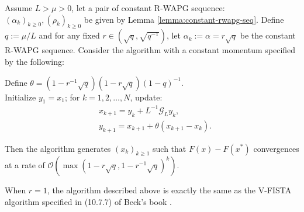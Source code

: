 \documentclass[12pt]{article}
\begin{document}
        \begin{theorem}\label{thm:fixed-momentum-fista}
            Assume $L > \mu > 0$, let a pair of constant R-WAPG sequence: $(\alpha_k)_{k \ge0}, (\rho_k)_{k \ge 0}$ be given by Lemma \ref{lemma:constant-rwapg-seq}.
            Define $q := \mu/L$ and for any fixed $r \in \left(\sqrt{q}, \sqrt{q^{-1}}\right)$, let $\alpha_k := \alpha = r \sqrt{q}$ be the constant R-WAPG sequence. 
            Consider the algorithm with a constant momentum specified by the following: 
            \begin{tcolorbox}
                Define $\theta = \left(1 - r^{-1}\sqrt{q}\right)(1 - r\sqrt{q})(1 - q)^{-1}$. 
                \\
                Initialize $y_1 = x_1$; for $k = 1, 2, \ldots, N$, update: 
                \begin{align*}
                    &x_{k + 1} = y_k + L^{-1}\mathcal G_L y_k, 
                    \\
                    & y_{k + 1} = x_{k + 1} + \theta(x_{k + 1} - x_k). 
                \end{align*}
            \end{tcolorbox}
            Then the algorithm generates $(x_k)_{k \ge 1}$ such that $F(x) - F(x^*)$ convergences at a rate of $\mathcal O\left(\max(1 - r\sqrt{q}, 1 - r^{-1}\sqrt{q})^k\right)$. 
        \end{theorem}
        \begin{remark}
            When $r = 1$, the algorithm described above is exactly the same as the V-FISTA algorithm specified in (10.7.7) of Beck's book \cite{beck_first-order_2017}. 
        \end{remark}


    
\end{document}
